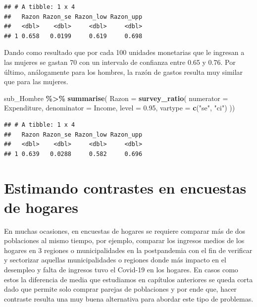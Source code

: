 \documentclass[
  spanish,
  12pt,
]{book}
\newenvironment{Shaded}{\begin{snugshade}}{\end{snugshade}}
\newcommand{\AttributeTok}[1]{\textcolor[rgb]{0.13,0.29,0.53}{#1}}
\newcommand{\FloatTok}[1]{\textcolor[rgb]{0.00,0.00,0.81}{#1}}
\newcommand{\FunctionTok}[1]{\textcolor[rgb]{0.13,0.29,0.53}{\textbf{#1}}}
\newcommand{\NormalTok}[1]{#1}
\newcommand{\SpecialCharTok}[1]{\textcolor[rgb]{0.81,0.36,0.00}{\textbf{#1}}}
\newcommand{\StringTok}[1]{\textcolor[rgb]{0.31,0.60,0.02}{#1}}
\begin{document}
\begin{verbatim}
## # A tibble: 1 x 4
##   Razon Razon_se Razon_low Razon_upp
##   <dbl>    <dbl>     <dbl>     <dbl>
## 1 0.658   0.0199     0.619     0.698
\end{verbatim}

Dando como resultado que por cada 100 unidades monetarias que le ingresan a las mujeres se gastan 70 con un intervalo de confianza entre 0.65 y 0.76. Por último, análogamente para los hombres, la razón de gastos resulta muy similar que para las mujeres.

\begin{Shaded}
\begin{Highlighting}[]
\NormalTok{sub\_Hombre }\SpecialCharTok{\%\textgreater{}\%} \FunctionTok{summarise}\NormalTok{(}
    \AttributeTok{Razon =}  \FunctionTok{survey\_ratio}\NormalTok{(}
      \AttributeTok{numerator =}\NormalTok{ Expenditure,}
      \AttributeTok{denominator =}\NormalTok{ Income,}
      \AttributeTok{level =} \FloatTok{0.95}\NormalTok{,}
    \AttributeTok{vartype =}  \FunctionTok{c}\NormalTok{(}\StringTok{"se"}\NormalTok{, }\StringTok{"ci"}\NormalTok{)}
\NormalTok{    ))}
\end{Highlighting}
\end{Shaded}

\begin{verbatim}
## # A tibble: 1 x 4
##   Razon Razon_se Razon_low Razon_upp
##   <dbl>    <dbl>     <dbl>     <dbl>
## 1 0.639   0.0288     0.582     0.696
\end{verbatim}

\section{Estimando contrastes en encuestas de hogares}\label{estimando-contrastes-en-encuestas-de-hogares}

En muchas ocasiones, en encuestas de hogares se requiere comparar más de dos poblaciones al mismo tiempo, por ejemplo, comparar los ingresos medios de los hogares en 3 regiones o municipalidades en la postpandemia con el fin de verificar y sectorizar aquellas municipalidades o regiones donde más impacto en el desempleo y falta de ingresos tuvo el Covid-19 en los hogares. En casos como estos la diferencia de media que estudiamos en capítulos anteriores se queda corta dado que permite solo comprar parejas de poblaciones y por ende que, hacer contraste resulta una muy buena alternativa para abordar este tipo de problemas.
\end{document}
